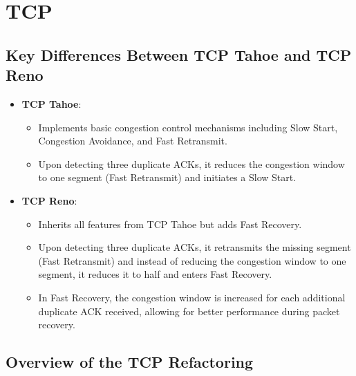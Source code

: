 \chapter{TCP}

\section{Key Differences Between TCP Tahoe and TCP Reno}
\begin{itemize}
    \item \textbf{TCP Tahoe}: 
    \begin{itemize}
        \item Implements basic congestion control mechanisms including Slow Start, Congestion Avoidance, and Fast Retransmit.
        \item Upon detecting three duplicate ACKs, it reduces the congestion window to one segment (Fast Retransmit) and initiates a Slow Start.
    \end{itemize}
    \item \textbf{TCP Reno}:
    \begin{itemize}
        \item Inherits all features from TCP Tahoe but adds Fast Recovery.
        \item Upon detecting three duplicate ACKs, it retransmits the missing segment (Fast Retransmit) and instead of reducing the congestion window to one segment, it reduces it to half and enters Fast Recovery.
        \item In Fast Recovery, the congestion window is increased for each additional duplicate ACK received, allowing for better performance during packet recovery.
    \end{itemize}
\end{itemize}

\newpage

\section{Overview of the TCP Refactoring}

